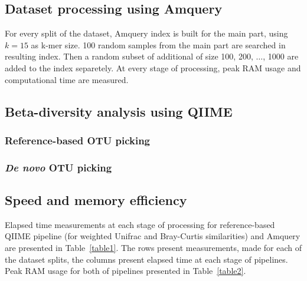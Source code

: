 \documentclass[10pt,letterpaper]{article}
\begin{document}
\subsection*{Dataset processing using Amquery}
For every split of the dataset, Amquery index is built for the main part, using $k=15$ as k-mer size. 100 random samples from the main part are searched in resulting index. 
Then a random subset of additional of size 100, 200, $\dots$, 1000 are added to the index separetely. At every stage of processing, peak RAM usage and computational time are measured.


\subsection*{Beta-diversity analysis using QIIME}
\subsubsection*{Reference-based OTU picking}
\subsubsection*{\textit{De novo} OTU picking}



\subsection*{Speed and memory efficiency}
Elapsed time measurements at each stage of processing for reference-based QIIME pipeline (for weighted Unifrac and Bray-Curtis similarities) and Amquery are presented in Table~\ref{table1}. 
The rows present measurements, made for each of the dataset splits, the columns present elapsed time at each stage of pipelines. 
Peak RAM usage for both of pipelines presented in Table~\ref{table2}.
\end{document}

